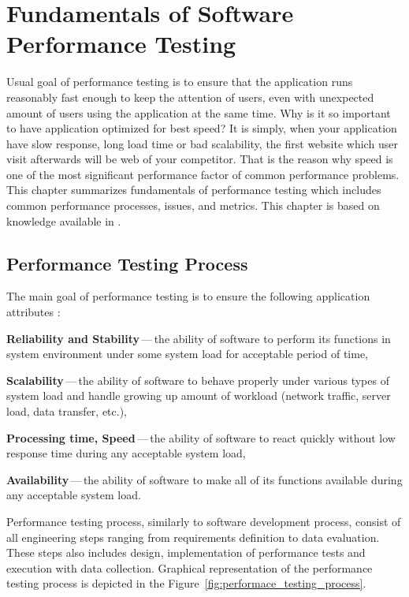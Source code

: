 
\chapter{Fundamentals of Software Performance Testing}
\label{Fundamentals of Software Performance Testing}
Usual goal of performance testing is to ensure that the application runs reasonably fast enough to keep the attention of users, even with unexpected amount of users using the application at the same time. Why is it so important to have application optimized for best speed? It is simply, when your application have slow response, long load time or bad scalability, the first website which user visit afterwards will be web of your competitor. That is the reason why speed is one of the most significant performance factor of common performance problems. This chapter summarizes fundamentals of performance testing which includes common performance processes, issues, and metrics. This chapter is based on knowledge available in \cite{Molyneaux:TAoAPT, Kurkova:Thesis:2017, DIN:PHD, ISTQB}.


\section{Performance Testing Process}
\label{Performance Testing Process}
The main goal of performance testing is to ensure the following application attributes \cite{GAO:MEASURING}:

\begin{description}
	\setlength\itemsep{0em}
	\item \textbf{Reliability and Stability}\,---\,the ability of software to perform its functions in system environment under some system load for acceptable period of time,
	\item \textbf{Scalability}\,---\,the ability of software to behave properly under various types of system load and handle growing up amount of workload (network traffic, server load, data transfer, etc.),
	\item \textbf{Processing time, Speed}\,---\,the ability of software to react quickly without low response time during any acceptable system load,
	\item \textbf{Availability}\,---\,the ability of software to make all of its functions available during any acceptable system load.
\end{description}

Performance testing process, similarly to software development process, consist of all engineering steps ranging from requirements definition to data evaluation. These steps also includes design, implementation of performance tests and execution with data collection. Graphical representation of the performance testing process is depicted in the Figure~\ref{fig:performace_testing_process}. 

